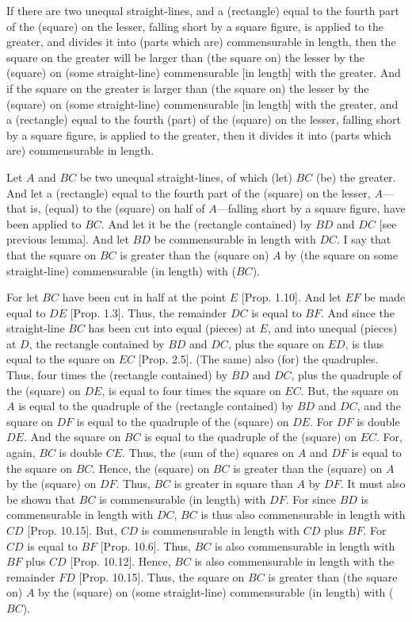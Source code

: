 \begin{Parallel}{}{}
{If there are two unequal straight-lines,
and a (rectangle) equal to the fourth part of the (square) on the
lesser, falling short by a square figure, is applied to the greater, and
divides it into (parts which are) commensurable in length, then
 the  square on the greater  will be  larger than (the  square on) the lesser  by the (square)
on (some straight-line) commensurable [in length] with the greater.
And if the square on the greater is larger than (the square on) the lesser  by the (square)
on (some straight-line) commensurable [in length] with the greater, and
a (rectangle) equal to the fourth (part) of the (square) on the lesser,
falling short by a square figure, is applied to the greater, then it divides it into (parts
which are) commensurable in length.

Let $A$ and $BC$ be two unequal straight-lines, of which (let) $BC$ (be) the
greater. And let a (rectangle) equal to the fourth part of the (square) on the
lesser, $A$---that is, (equal) to the (square) on half of $A$---falling short by a
square figure, have been applied to $BC$. And let it be the (rectangle contained) by $BD$ and $DC$ [see previous lemma]. And let $BD$ be commensurable in length with
$DC$. I say that that the square on $BC$ is greater than the (square on) $A$ by (the square on some straight-line) commensurable (in length) with ($BC$).

\epsfysize=1.1in
\centerline{}

For let $BC$ have been cut in  half at the point $E$ [Prop. 1.10]. And let $EF$ be made equal to
$DE$ [Prop. 1.3]. Thus, the remainder $DC$
is equal to $BF$. And since the straight-line $BC$ has been cut into equal
(pieces) at $E$, and into unequal (pieces) at $D$, the rectangle contained by
$BD$ and $DC$, plus the square on $ED$, is thus equal to the square on $EC$ [Prop. 2.5]. (The same) also (for) the quadruples.  
Thus, four times the (rectangle contained) by $BD$ and $DC$, plus
the quadruple of the (square) on $DE$, is equal to four times the square on 
$EC$. But, the square on $A$ is equal to the quadruple of the (rectangle
contained) by $BD$ and $DC$, and the square on $DF$ is equal to
the quadruple of the (square) on $DE$. For $DF$ is double $DE$. 
And the square on  $BC$ is equal to the quadruple of the (square) on $EC$.
For, again, $BC$ is double $CE$. Thus, the (sum of the) squares on $A$ and
$DF$ is equal to the square on $BC$. Hence, the (square) on $BC$
is greater than the (square) on $A$ by the (square) on $DF$. Thus,
$BC$ is greater in square than $A$ by $DF$. It must also be shown that $BC$
is commensurable (in length) with $DF$. For since $BD$ is commensurable in length
with $DC$, $BC$ is thus also commensurable in length with $CD$ [Prop. 10.15]. 
But, $CD$ is commensurable in length with $CD$ plus $BF$. For $CD$ is equal
to $BF$ [Prop. 10.6].  Thus, $BC$ is also commensurable in length with $BF$ plus $CD$
[Prop. 10.12]. Hence, $BC$ is also commensurable
in length with the remainder $FD$ [Prop. 10.15]. Thus, the square on $BC$ is
greater than (the square on) $A$ by the (square) on (some straight-line)
commensurable (in length) with ($BC$).

}
\end{Parallel}
